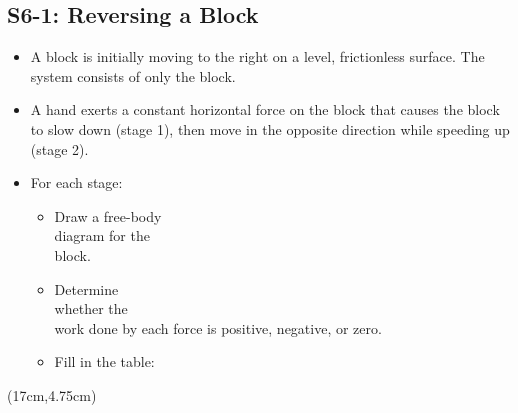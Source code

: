 \documentclass[]{article}
\begin{document}
\begin{PresentSpace}
\vspace{-10pt}
\section*{S6-1: Reversing a Block}
\vspace{-10pt}
\begin{itemize}
	\item A block is initially moving to the right on a level, frictionless surface. The system consists of only the block.
	\item A hand exerts a constant horizontal force on the block that causes the block to slow down (stage 1), then move in the opposite direction while speeding up (stage 2).
	\item For each stage:
	\begin{itemize}
		\item Draw a free-body \\
		diagram for the \\
		block.
		\item Determine \\
		whether the \\
		work done by each force is positive, negative, or zero.
		\item Fill in the table:
	\end{itemize}
\end{itemize}
\end{PresentSpace}
\begin{textblock*}{10cm}(17cm,4.75cm)
	\begin{center}
		\normalsize
	\end{center}
\end{textblock*}
\end{document}
